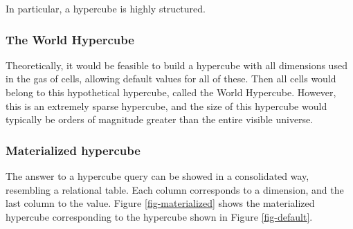\documentclass{acm_proc_article-sp}
\begin{document}
In particular, a hypercube is highly structured.

\subsubsection{The World Hypercube}
Theoretically, it would be feasible to build a hypercube with all dimensions used in the gas of cells, allowing default values for all of these. Then all cells would belong to this hypothetical hypercube, called the World Hypercube. However, this is an extremely sparse hypercube, and the size of this hypercube would typically be orders of magnitude greater than the entire visible universe.

\subsubsection{Materialized hypercube}

The answer to a hypercube query can be showed in a consolidated way, resembling a relational table. Each column corresponds to a dimension, and the last column to the value. Figure \ref{fig-materialized} shows the materialized hypercube corresponding to the hypercube shown in Figure \ref{fig-default}.
\end{document}
